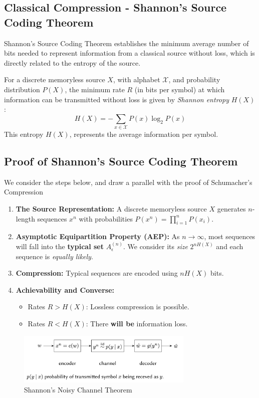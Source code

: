 \subsection{Classical Compression - Shannon's Source Coding Theorem}

Shannon’s Source Coding Theorem establishes the minimum average number of bits needed to represent information from a classical source without loss, which is directly related to the entropy of the source.

For a discrete memoryless source \(X\), with alphabet \(\mathcal{X}\), and probability distribution \(P(X)\), the minimum rate \(R\) (in bits per symbol) at which information can be transmitted without loss is given by \textit{Shannon entropy} \(H(X)\):
\[
H(X) = -\sum_{x \in \mathcal{X}} P(x) \log_2 P(x)
\]
This entropy \(H(X)\), represents the average information per symbol.

\subsection{Proof of Shannon's Source Coding Theorem}
We consider the steps below, and draw a parallel with the proof of Schumacher's Compression 

\begin{enumerate}
    \item \textbf{The Source Representation:} A discrete memoryless source \(X\) generates \(n\)-length sequences \(x^n\) with probabilities \(P(x^n) = \prod_{i=1}^n P(x_i)\).
    \item \textbf{Asymptotic Equipartition Property (AEP):} As \(n \to \infty\), most sequences will fall into the \textbf{typical set} \(A_\epsilon^{(n)}\).  We consider its \textit{size} \(2^{nH(X)}\) and each sequence is  \textit{equally likely}. 
    \item \textbf{Compression:} Typical sequences are encoded using \(nH(X)\) bits. 
    \item \textbf{Achievability and Converse:}
    \begin{itemize}
        \item Rates \(R > H(X)\): Lossless compression is possible.
        \item Rates \(R < H(X)\): There \textbf{will be} information loss.
    \end{itemize}
\end{enumerate}

\begin{figure}[H]
    \centering
    \includegraphics[width=0.75\textwidth]{figures/shannon_pic.png}
    \caption{Shannon's Noisy Channel Theorem \cite{jahooShannonsNoisy}}
\end{figure}

